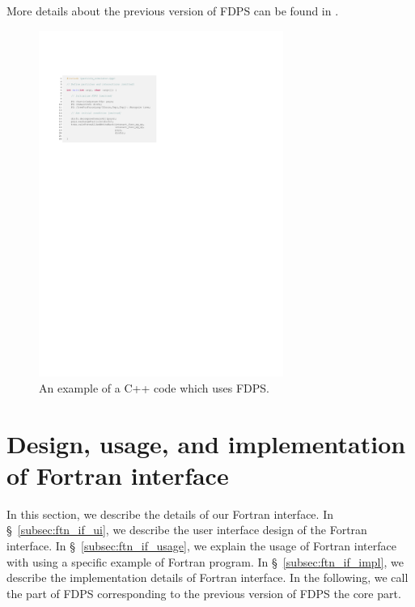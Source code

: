 \documentclass[proof,useamsfonts]{pasj01}
\begin{document}
More details about the previous version of FDPS can be found in \citet{iwasawa16:_implem_fdps}.

\begin{figure}[h]
\begin{center}
\includegraphics[width=8cm]{figures/src_cpp_smpl}
\end{center}
\caption{An example of a C++ code which uses FDPS. }
\label{fig:src_cpp_smpl}  
\end{figure}


\section{Design, usage, and implementation of Fortran interface}
\label{sec:design_implementation}
In this section, we describe the details of our Fortran interface. In \S~\ref{subsec:ftn_if_ui}, we describe the user interface design of the Fortran interface. In \S~\ref{subsec:ftn_if_usage}, we explain the usage of Fortran interface with using a specific example of Fortran program. In \S~\ref{subsec:ftn_if_impl}, we describe the implementation details of Fortran interface. In the following, we call the part of FDPS corresponding to the previous version of FDPS the core part.

\end{document}
